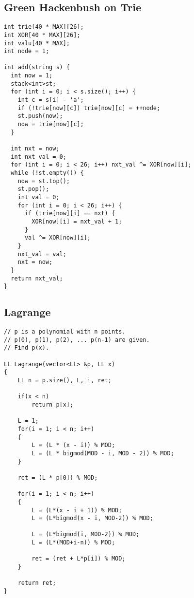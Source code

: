 \documentclass[FSZ,a4paper,onesided]{article}
\begin{document}
\begin{multicols*}{\COLS}
\subsection{Green Hackenbush on Trie}
\begin{lstlisting}
int trie[40 * MAX][26];
int XOR[40 * MAX][26];
int valu[40 * MAX];
int node = 1;

int add(string s) {
  int now = 1;
  stack<int>st;
  for (int i = 0; i < s.size(); i++) {
    int c = s[i] - 'a';
    if (!trie[now][c]) trie[now][c] = ++node;
    st.push(now);
    now = trie[now][c];
  }

  int nxt = now;
  int nxt_val = 0;
  for (int i = 0; i < 26; i++) nxt_val ^= XOR[now][i];
  while (!st.empty()) {
    now = st.top();
    st.pop();
    int val = 0;
    for (int i = 0; i < 26; i++) {
      if (trie[now][i] == nxt) {
        XOR[now][i] = nxt_val + 1;
      }
      val ^= XOR[now][i];
    }
    nxt_val = val;
    nxt = now;
  }
  return nxt_val;
}
\end{lstlisting}
\subsection{Lagrange}
\begin{lstlisting}
// p is a polynomial with n points.
// p(0), p(1), p(2), ... p(n-1) are given.
// Find p(x).

LL Lagrange(vector<LL> &p, LL x)
{
    LL n = p.size(), L, i, ret;
 
    if(x < n)
        return p[x];
 
    L = 1;
    for(i = 1; i < n; i++)
    {
        L = (L * (x - i)) % MOD;
        L = (L * bigmod(MOD - i, MOD - 2)) % MOD;
    }
 
    ret = (L * p[0]) % MOD;
 
    for(i = 1; i < n; i++)
    {
        L = (L*(x - i + 1)) % MOD;
        L = (L*bigmod(x - i, MOD-2)) % MOD;
        
        L = (L*bigmod(i, MOD-2)) % MOD;
        L = (L*(MOD+i-n)) % MOD;
 
        ret = (ret + L*p[i]) % MOD;
    }
 
    return ret;
}\end{lstlisting}

\end{multicols*}
\end{document}

